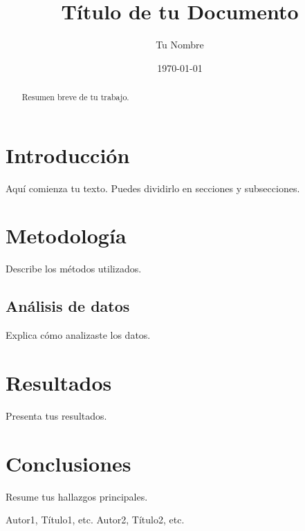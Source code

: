 \documentclass[12pt]{article} %
\title{Título de tu Documento}
\author{Tu Nombre}
\date{\today} %
\begin{document}
\maketitle %

\begin{abstract}
Resumen breve de tu trabajo.
\end{abstract}

\section{Introducción}
Aquí comienza tu texto. Puedes dividirlo en secciones y subsecciones.

\section{Metodología}
Describe los métodos utilizados.

\subsection{Análisis de datos}
Explica cómo analizaste los datos.

\section{Resultados}
Presenta tus resultados.

\section{Conclusiones}
Resume tus hallazgos principales.

\begin{thebibliography}{9} %
 Autor1, Título1, etc.
 Autor2, Título2, etc.
\end{thebibliography}
\end{document}
